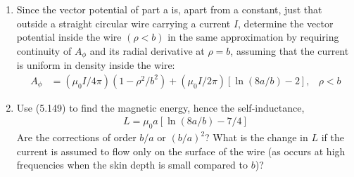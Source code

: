 \documentclass[letter,12pt]{article}
\theoremstyle{definition}
\newtheorem*{sol}{Solution}
\begin{document}
\begin{enumerate}
\begin{enumerate}
\begin{sol}
\begin{align*}
                        \right)
                        \left[
                            \frac{-1 + 21 \rho / 4 a}{1 - \frac{3\rho}{4a}}
                        \right]
                        \\
                        &=
                        \frac{\mu_0 I}{8}
                        \left(
                            \frac{1}{2}
                            -
                            \frac{1}{4}\frac{\rho}{a}\sin \phi
                        \right)
                        \left[
                            \frac{-1 + 21 \rho / 4 a}{1 - \frac{3\rho}{4a}}
                        \right]
                        \\
                        &= \cdots
                    \end{align*}
                \end{sol}
            \item
                Since the vector potential of part a is, apart from a
                constant, just that outside a straight circular wire
                carrying a current $I$, determine the vector potential
                inside the wire $(\rho < b)$ in the same approximation
                by requiring continuity of $A_\phi$ and its radial
                derivative at $\rho = b$, assuming that the current is
                uniform in density inside the wire:
                \begin{align*}
                    A_\phi &=
                    (\mu_0 I / 4 \pi)(1 - \rho^2 / b^2)
                    +
                    (\mu_0 I / 2 \pi)
                    [\ln(8a / b) - 2],
                    &
                    \rho < b
                \end{align*}
            \item
                Use (5.149) to find the magnetic energy, hence the
                self-inductance,
                \begin{align*}
                    L = \mu_0a[\ln(8a/b) - 7/4]
                \end{align*}
                Are the corrections of order $b/a$ or ${(b/a)}^2$?
                What is the change in $L$ if the current is assumed to
                flow only on the surface of the wire (as occurs at
                high frequencies when the skin depth is small compared
                to $b$)?
        \end{enumerate}
\end{enumerate}
\end{document}
